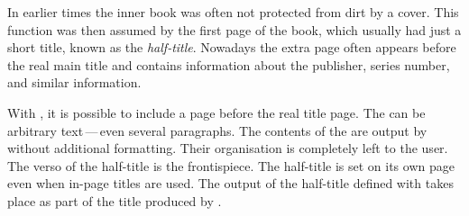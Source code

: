 \begin{Declaration}
\end{Declaration}%
\begin{Explain}%
  In earlier times the inner book was often not protected from dirt by a
  cover. This function was then assumed by the first page of the book, which
  usually had just a short title, known as the \emph{half-title}. Nowadays the
  extra page often appears before the real main title and contains information
  about the publisher, series number, and similar information.
\end{Explain}
With {\KOMAScript}, it is possible to include a page before the real title
page. The  can be arbitrary text\,---\,even several
paragraphs. The contents of the  are output by {\KOMAScript}
without additional formatting. Their organisation is completely left to the
user. The verso of the half-title is the frontispiece. The half-title is set on its own page even when in-page
titles are used. The output of the half-title defined with 
takes place as part of the title produced by
.

